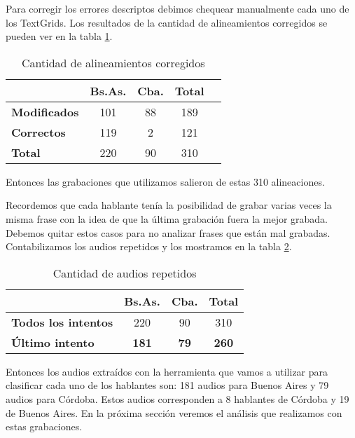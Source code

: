 Para corregir los errores descriptos debimos chequear manualmente cada uno de los TextGrids. Los resultados de la cantidad de alineamientos corregidos se pueden ver en la tabla \ref{eva_table_align}.

\begin{table}[h]
\centering
\begin{tabular}{|l|c|c|c|c|}
\hline
\textbf{}  & \textbf{Bs.As. } & \textbf{Cba.} & \textbf{Total} \\ \hline
\textbf{Modificados}  & 101 & 88 & 189 \\ \hline
\textbf{Correctos}  & 119 & 2 & 121 \\ \hline
\textbf{Total} & 220 & 90 & 310 \\ \hline
\end{tabular}
\caption{Cantidad de alineamientos corregidos}
\label{eva_table_align}
\end{table}

Entonces las grabaciones que utilizamos salieron de estas 310 alineaciones. 

Recordemos que cada hablante tenía la posibilidad de grabar varias veces la misma frase con la idea de que la última grabación fuera la mejor grabada. Debemos quitar estos casos para no analizar frases que están mal grabadas. Contabilizamos los audios repetidos y los mostramos en la tabla \ref{eva_table_rep}.

\begin{table}[H]
\centering
\begin{tabular}{|l|c|c|c|}
\hline
\textbf{}  & \textbf{Bs.As. } & \textbf{Cba.} & \textbf{Total} \\ \hline
\textbf{Todos los intentos}  & 220 & 90 & 310 \\ \hline
\textbf{Último intento}  & \textbf{181} & \textbf{79} & \textbf{260} \\ \hline
\end{tabular}
\caption{Cantidad de audios repetidos}
\label{eva_table_rep}
\end{table}

Entonces los audios extraídos con la herramienta que vamos a utilizar para clasificar cada uno de los hablantes son: 181 audios para Buenos Aires y 79 audios para Córdoba. Estos audios corresponden a 8 hablantes de Córdoba y 19 de Buenos Aires.
En la próxima sección veremos el análisis que realizamos con estas grabaciones. 
